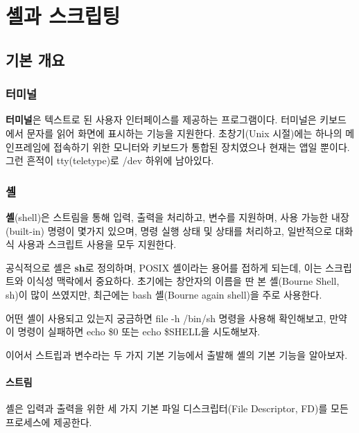 \chapter{셸과 스크립팅}

\section{기본 개요}
\subsection*{터미널}
\begin{flushleft}
    \textbf{터미널}은 텍스트로 된 사용자 인터페이스를 제공하는 프로그램이다.
    터미널은 키보드에서 문자를 읽어 화면에 표시하는 기능을 지원한다.
    초창기(Unix 시절)에는 하나의 메인프레임에 접속하기 위한 모니터와 키보드가 통합된 장치였으나
    현재는 앱일 뿐이다.
    그런 흔적이 tty(teletype)로 /dev 하위에 남아있다.
\end{flushleft}

\subsection*{셸}
\begin{flushleft}
    \textbf{셸}(shell)은 스트림을 통해 입력, 출력을 처리하고, 변수를 지원하며,
    사용 가능한 내장(built-in) 명령이 몇가지 있으며, 명령 실행 상태 및 상태를 처리하고,
    일반적으로 대화식 사용과 스크립트 사용을 모두 지원한다.
\end{flushleft}

\begin{flushleft}
    공식적으로 셸은 \textbf{sh}로 정의하며, POSIX 셸이라는 용어를 접하게 되는데,
    이는 스크립트와 이식성 맥락에서 중요하다.
    초기에는 창안자의 이름을 딴 본 셸(Bourne Shell, sh)이 많이 쓰였지만,
    최근에는 bash 셸(Bourne again shell)을 주로 사용한다.
\end{flushleft}

\begin{flushleft}
    어떤 셸이 사용되고 있는지 궁금하면 file -h /bin/sh 명령을 사용해 확인해보고,
    만약 이 명령이 실패하면 echo \$0 또는 echo \$SHELL을 시도해보자.
\end{flushleft}

\begin{flushleft}
    이어서 스트립과 변수라는 두 가지 기본 기능에서 출발해
    셸의 기본 기능을 알아보자.
\end{flushleft}

\subsubsection*{스트림}
\begin{flushleft}
    셸은 입력과 출력을 위한 세 가지 기본 파일 디스크립터(File Descriptor, FD)를 모든 프로세스에 제공한다.
\end{flushleft}

